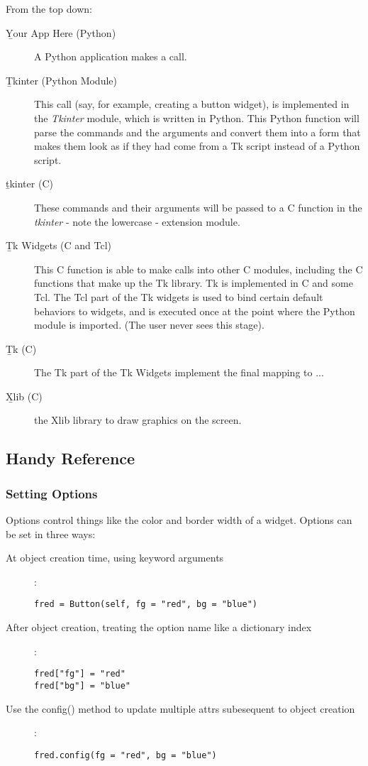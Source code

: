 From the top down:
\begin{description}
\item[\b{Your App Here (Python)}]
A Python application makes a  call.

\item[\b{Tkinter (Python Module)}]
This call (say, for example, creating a button widget), is
implemented in the \emph{Tkinter} module, which is written in
Python.  This Python function will parse the commands and the
arguments and convert them into a form that makes them look as if they
had come from a Tk script instead of a Python script.

\item[\b{tkinter (C)}]
These commands and their arguments will be passed to a C function
in the \emph{tkinter} - note the lowercase - extension module.

\item[\b{Tk Widgets} (C and Tcl)]
This C function is able to make calls into other C modules,
including the C functions that make up the Tk library.  Tk is
implemented in C and some Tcl.  The Tcl part of the Tk widgets is used
to bind certain default behaviors to widgets, and is executed once at
the point where the Python  module is
imported. (The user never sees this stage).

\item[\b{Tk (C)}]
The Tk part of the Tk Widgets implement the final mapping to ...

\item[\b{Xlib (C)}]
the Xlib library to draw graphics on the screen.
\end{description}


\subsection{Handy Reference}

\subsubsection{Setting Options
               \label{tkinter-setting-options}}

Options control things like the color and border width of a widget.
Options can be set in three ways:

\begin{description}
\item[At object creation time, using keyword arguments]:
\begin{verbatim}
fred = Button(self, fg = "red", bg = "blue")
\end{verbatim}
\item[After object creation, treating the option name like a dictionary index]:
\begin{verbatim}
fred["fg"] = "red"
fred["bg"] = "blue"
\end{verbatim}
\item[Use the config() method to update multiple attrs subesequent to
object creation]:
\begin{verbatim}
fred.config(fg = "red", bg = "blue")
\end{verbatim}
\end{description}

